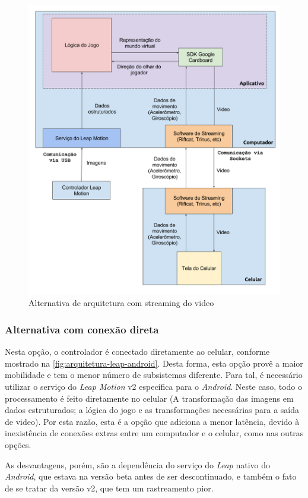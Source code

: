 \begin{figure}
	\centering
	\includegraphics[width=0.7\linewidth]{images/Arquitetura-leap-pc-riftcat-android}
	\caption{Alternativa de arquitetura com streaming do video}
	\label{fig:Arquitetura-leap-pc-riftcat-android}
\end{figure}

\subsubsection{Alternativa com conexão direta}\label{subsubsec-arquiteturas-leapmotion-android}

Nesta opção, o controlador é conectado diretamente ao celular, conforme mostrado na \autoref{fig:arquitetura-leap-android}. Desta forma, esta opção provê a maior mobilidade e tem o menor número de subsistemas diferente. Para tal, é necessário utilizar o serviço do \textit{Leap Motion} v2 específica para o \textit{Android}. Neste caso, todo o processamento é feito diretamente no celular (A transformação das imagens em dados estruturados; a lógica do jogo e as transformações necessárias para a saída de video). Por esta razão, esta é a opção que adiciona a menor latência, devido à inexistência de conexões extras entre um computador e o celular, como nas outras opções.

As desvantagens, porém, são a dependência do serviço do \textit{Leap} nativo do \textit{Android}, que estava na versão beta antes de ser descontinuado, e também o fato de se tratar da versão v2, que tem um rastreamento pior.

